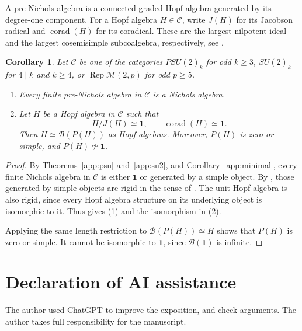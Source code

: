 \documentclass[11pt, a4paper]{article}
\numberwithin{equation}{section}
\newcommand{\C}{\mathcal C}
\newcommand{\B}{\mathcal B}
\newcommand{\one}{\mathbf 1}
\newtheorem{corollary}[theorem]{Corollary}
\begin{document}
A pre-Nichols algebra is a connected graded Hopf algebra generated
by its degree-one component. For a Hopf algebra $H\in\C$, write
$J(H)$ for its Jacobson radical and $\operatorname{corad}(H)$ for
its coradical. These are the largest nilpotent ideal and the
largest cosemisimple subcoalgebra, respectively, see
\cite[Section~2.2]{defofnichols}.

\begin{corollary}\label{app:psu-hopf}
{Let $\C$ be one of the categories $PSU(2)_k$ for odd
$k\ge3$, $SU(2)_k$ for $4\mid k$ and $k\ge4$, or
$\operatorname{Rep}\mathcal M(2,p)$ for odd $p\ge5$.}
\begin{enumerate}
\item Every finite pre-Nichols algebra in $\C$ is a Nichols algebra.
\item Let $H$ be a Hopf algebra in $\C$ such that
\[
 H/J(H)\simeq\one,
 \qquad \operatorname{corad}(H)\simeq\one.
\]
Then $H\simeq\B(P(H))$ as Hopf algebras.
Moreover, $P(H)$ is zero or simple, and $P(H)\not\simeq\one$.
\end{enumerate}
\end{corollary}

\begin{proof}
By  {Theorems~\ref{app:psu} and~\ref{app:su2}, and
Corollary~\ref{app:minimal}}, every finite Nichols algebra in $\C$
is either $\one$ or generated by a simple object.
By \cite[Theorem~1.4]{defofnichols}, those generated by simple
objects are rigid in the sense of \cite[Definition~1.3]{defofnichols}.
The unit Hopf algebra is also rigid, since every Hopf algebra
structure on its underlying object is isomorphic to it.
Thus \cite[Theorem~1.6]{defofnichols} gives \textup{(1)} and the
isomorphism in \textup{(2)}.

Applying  {the same length restriction} to $\B(P(H))\simeq H$ shows
that $P(H)$ is zero or simple. It cannot be isomorphic to
$\one$, since $\B(\one)$ is infinite.
\end{proof}

\endgroup

\section*{ {Declaration of AI assistance}}
 {The author used ChatGPT to improve the exposition,
and check arguments. The author  takes full responsibility for the manuscript.}


      
    
\end{document}
